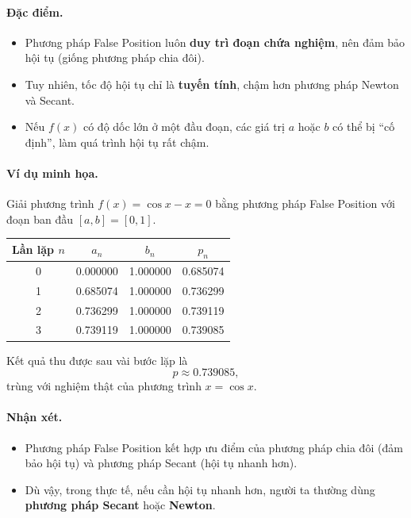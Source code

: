 \paragraph*{Đặc điểm.}
\begin{itemize}
    \item Phương pháp False Position luôn \textbf{duy trì đoạn chứa nghiệm}, 
    nên đảm bảo hội tụ (giống phương pháp chia đôi).
    \item Tuy nhiên, tốc độ hội tụ chỉ là \textbf{tuyến tính}, 
    chậm hơn phương pháp Newton và Secant.
    \item Nếu $f(x)$ có độ dốc lớn ở một đầu đoạn, các giá trị $a$ hoặc $b$ có thể bị “cố định”, 
    làm quá trình hội tụ rất chậm.
\end{itemize}

\paragraph*{Ví dụ minh họa.}
Giải phương trình $f(x) = \cos x - x = 0$ bằng phương pháp False Position 
với đoạn ban đầu $[a, b] = [0, 1]$.

\begin{center}
\begin{tabular}{|c|c|c|c|}
\hline
\textbf{Lần lặp} $n$ & $a_n$ & $b_n$ & $p_n$ \\
\hline
0 & 0.000000 & 1.000000 & 0.685074 \\
1 & 0.685074 & 1.000000 & 0.736299 \\
2 & 0.736299 & 1.000000 & 0.739119 \\
3 & 0.739119 & 1.000000 & 0.739085 \\
\hline
\end{tabular}
\end{center}

Kết quả thu được sau vài bước lặp là 
\[
    p \approx 0.739085,
\]
trùng với nghiệm thật của phương trình $x = \cos x$.

\paragraph*{Nhận xét.}
\begin{itemize}
    \item Phương pháp False Position kết hợp ưu điểm của phương pháp chia đôi (đảm bảo hội tụ) và phương pháp Secant (hội tụ nhanh hơn).
    \item Dù vậy, trong thực tế, nếu cần hội tụ nhanh hơn, người ta thường dùng \textbf{phương pháp Secant} hoặc \textbf{Newton}.
\end{itemize}

